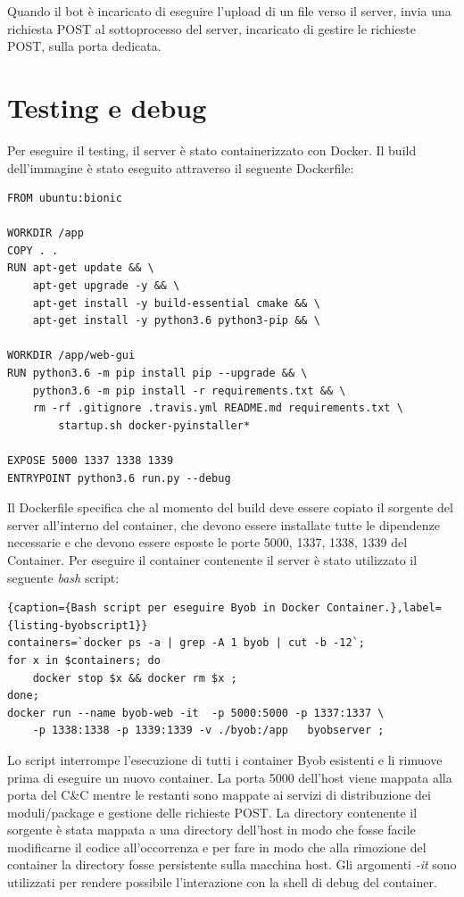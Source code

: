 Quando il bot è incaricato di eseguire l'upload di un file verso il server, invia una richiesta POST al sottoprocesso del server, incaricato di gestire le richieste POST, sulla porta dedicata.


\section{Testing e debug}
Per eseguire il testing, il server è stato containerizzato con Docker.
Il build dell'immagine è stato eseguito attraverso il seguente Dockerfile:
\lstset{  basicstyle=\footnotesize,
frame=single}
\begin{lstlisting}[caption={Byob server Dockerfile.},label={listing-byobdocker},frame=single]
FROM ubuntu:bionic

WORKDIR /app
COPY . .
RUN apt-get update && \
    apt-get upgrade -y && \
    apt-get install -y build-essential cmake && \
    apt-get install -y python3.6 python3-pip && \

WORKDIR /app/web-gui
RUN python3.6 -m pip install pip --upgrade && \
    python3.6 -m pip install -r requirements.txt && \
    rm -rf .gitignore .travis.yml README.md requirements.txt \
        startup.sh docker-pyinstaller*

EXPOSE 5000 1337 1338 1339
ENTRYPOINT python3.6 run.py --debug
\end{lstlisting}
Il Dockerfile specifica che al momento del build deve essere copiato il sorgente del server all'interno del container, che devono essere installate tutte le dipendenze necessarie e che devono essere esposte le porte 5000, 1337, 1338, 1339 del Container.
Per eseguire  il container contenente il server è stato utilizzato  il seguente \textit{bash} script:
\begin{lstlisting}{caption={Bash script per eseguire Byob in Docker Container.},label={listing-byobscript1}}
containers=`docker ps -a | grep -A 1 byob | cut -b -12`;
for x in $containers; do 
    docker stop $x && docker rm $x ;
done;
docker run --name byob-web -it  -p 5000:5000 -p 1337:1337 \
    -p 1338:1338 -p 1339:1339 -v ./byob:/app   byobserver ;
\end{lstlisting}
Lo script interrompe l'esecuzione di tutti i container Byob esistenti e li rimuove prima di eseguire un nuovo container. La porta 5000 dell'host viene mappata alla porta del C\&C  mentre le restanti sono mappate ai servizi di distribuzione dei moduli/package e    gestione delle richieste POST. La directory contenente il sorgente è stata mappata a una directory dell'host in modo che fosse facile modificarne il codice all'occorrenza e per fare in modo che alla rimozione del container la directory fosse persistente sulla macchina host. Gli argomenti \textit{-it} sono utilizzati per rendere possibile l'interazione con la shell di debug del container.

